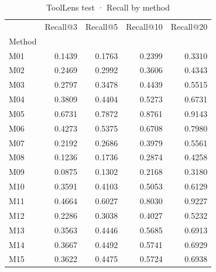 \begin{table}
\caption{ToolLens test · Recall by method}
\label{tab:ToolLens-test-comparison-comparison-recall}
\begin{tabular}{lrrrr}
\toprule
 & Recall@3 & Recall@5 & Recall@10 & Recall@20 \\
Method &  &  &  &  \\
\midrule
M01 & 0.1439 & 0.1763 & 0.2399 & 0.3310 \\
M02 & 0.2469 & 0.2992 & 0.3606 & 0.4343 \\
M03 & 0.2797 & 0.3478 & 0.4439 & 0.5515 \\
M04 & 0.3809 & 0.4404 & 0.5273 & 0.6731 \\
M05 & 0.6731 & 0.7872 & 0.8761 & 0.9143 \\
M06 & 0.4273 & 0.5375 & 0.6708 & 0.7980 \\
M07 & 0.2192 & 0.2686 & 0.3979 & 0.5561 \\
M08 & 0.1236 & 0.1736 & 0.2874 & 0.4258 \\
M09 & 0.0875 & 0.1302 & 0.2168 & 0.3180 \\
M10 & 0.3591 & 0.4103 & 0.5053 & 0.6129 \\
M11 & 0.4664 & 0.6027 & 0.8030 & 0.9227 \\
M12 & 0.2286 & 0.3038 & 0.4027 & 0.5232 \\
M13 & 0.3563 & 0.4446 & 0.5685 & 0.6913 \\
M14 & 0.3667 & 0.4492 & 0.5741 & 0.6929 \\
M15 & 0.3622 & 0.4475 & 0.5724 & 0.6938 \\
\bottomrule
\end{tabular}
\end{table}
